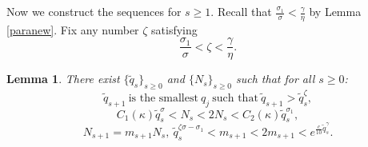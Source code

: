 \documentclass[reqno,12pt]{amsart}
\theoremstyle{plain}
\newtheorem{lemma}[theorem]{Lemma}
\theoremstyle{definition}
\numberwithin{equation}{section}
\begin{document}
Now we construct the sequences for $s\geqslant 1$. Recall that
$\frac{\sigma_{1}}{\sigma}< \frac{\gamma}{\eta}$ by Lemma \ref{paranew}. Fix any number $\zeta$ satisfying
\begin{equation}\label{zeta}
    \frac{\sigma_{1}}{\sigma}<\zeta< \frac{\gamma}{\eta}.
\end{equation}

\begin{lemma}\label{induction}
    There exist $\{\tilde{q}_{s}\}_{s\geqslant 0}$ and $\{N_{s}\}_{s\geqslant 0}$ such that for all $s\geqslant 0$:
\begin{equation}\label{qs}
    \tilde{q}_{s+1} \ \text{is the smallest}\ q_{j}\ \text{such that}\ \tilde{q}_{s+1}> \tilde{q}_{s}^{\zeta}, 
\end{equation}
\begin{equation}\label{Ns}
    C_{1}(\kappa)\tilde{q}_{s}^{\sigma}<N_{s}<2N_{s}<C_{2}(\kappa) \tilde{q}_{s}^{\sigma_{1}},
\end{equation}
\begin{equation}\label{ms}
    N_{s+1}=m_{s+1}N_{s},\ \tilde{q}_{s}^{\zeta \sigma-\sigma_{1}}< m_{s+1}<2m_{s+1}<e^{\frac{c}{10}\tilde{q}_{s}^{\gamma}}.
\end{equation}
\end{lemma}
\end{document}

